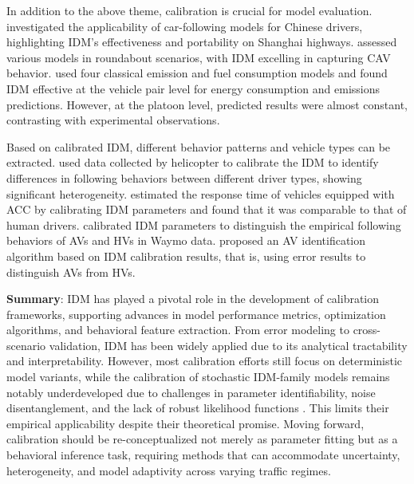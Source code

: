 \documentclass[a4paper,fleqn]{cas-sc}
\begin{document}
In addition to the above theme, calibration is crucial for model evaluation. \cite{zhuModelingCarFollowingBehaviorUrban2018b} investigated the applicability of car-following models for Chinese drivers, highlighting IDM's effectiveness and portability on Shanghai highways. \cite{campi_roundabouts_2024} assessed various models in roundabout scenarios, with IDM excelling in capturing CAV behavior. \cite{zhouExperimentalFeaturesEmissionsFuel2023b} used four classical emission and fuel consumption models and found IDM effective at the vehicle pair level for energy consumption and emissions predictions. However, at the platoon level, predicted results were almost constant, contrasting with experimental observations.

Based on calibrated IDM, different behavior patterns and vehicle types can be extracted. \cite{ossenHeterogeneityCarFollowingBehaviorTheory2011b} used data collected by helicopter to calibrate the IDM to identify differences in following behaviors between different driver types, showing significant heterogeneity. \cite{makridis_response_2020} estimated the response time of vehicles equipped with ACC by calibrating IDM parameters and found that it was comparable to that of human drivers. \cite{hu_autonomous_2023} calibrated IDM parameters to distinguish the empirical following behaviors of AVs and HVs in Waymo data. \cite{li_automated_2023} proposed an AV identification algorithm based on IDM calibration results, that is, using error results to distinguish AVs from HVs.

\textbf{Summary}: IDM has played a pivotal role in the development of calibration frameworks, supporting advances in model performance metrics, optimization algorithms, and behavioral feature extraction. From error modeling to cross-scenario validation, IDM has been widely applied due to its analytical tractability and interpretability. However, most calibration efforts still focus on deterministic model variants, while the calibration of stochastic IDM-family models remains notably underdeveloped due to challenges in parameter identifiability, noise disentanglement, and the lack of robust likelihood functions \cite{punzoCalibrationCarFollowingDynamicsAutomated2021}. This limits their empirical applicability despite their theoretical promise. Moving forward, calibration should be re-conceptualized not merely as parameter fitting but as a behavioral inference task, requiring methods that can accommodate uncertainty, heterogeneity, and model adaptivity across varying traffic regimes.
\end{document}

